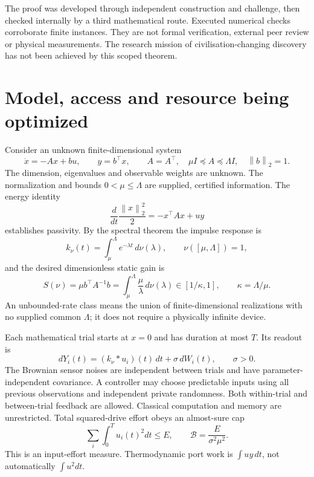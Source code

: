 \documentclass[11pt,a4paper]{article}
\newcommand{\norm}[1]{\left\lVert#1\right\rVert}
\begin{document}
The proof was developed through independent construction and challenge, then checked internally by a third mathematical route. Executed numerical checks corroborate finite instances. They are not formal verification, external peer review or physical measurements. The research mission of civilisation-changing discovery has not been achieved by this scoped theorem.

\section{Model, access and resource being optimized}

Consider an unknown finite-dimensional system
\begin{equation}\label{eq:model}
\dot x=-Ax+bu,\qquad y=b^\top x,\qquad
A=A^\top,\quad \mu I\preceq A\preceq\Lambda I,\quad \norm{b}_2=1.
\end{equation}
The dimension, eigenvalues and observable weights are unknown. The normalization and bounds $0<\mu\leq\Lambda$ are supplied, certified information. The energy identity
\begin{equation}
\frac{d}{dt}\frac{\norm{x}_2^2}{2}=-x^\top Ax+uy
\end{equation}
establishes passivity. By the spectral theorem the impulse response is
\begin{equation}
k_\nu(t)=\int_\mu^\Lambda e^{-\lambda t}\,d\nu(\lambda),
\qquad \nu([\mu,\Lambda])=1,
\end{equation}
and the desired dimensionless static gain is
\begin{equation}\label{eq:target}
S(\nu)=\mu b^\top A^{-1}b
=\int_\mu^\Lambda\frac{\mu}{\lambda}\,d\nu(\lambda)\in[1/\kappa,1],
\qquad\kappa=\Lambda/\mu.
\end{equation}
An unbounded-rate class means the union of finite-dimensional realizations with no supplied common $\Lambda$; it does not require a physically infinite device.

Each mathematical trial starts at $x=0$ and has duration at most $T$. Its readout is
\begin{equation}\label{eq:noise}
dY_i(t)=(k_\nu*u_i)(t)\,dt+\sigma\,dW_i(t),\qquad \sigma>0.
\end{equation}
The Brownian sensor noises are independent between trials and have parameter-independent covariance. A controller may choose predictable inputs using all previous observations and independent private randomness. Both within-trial and between-trial feedback are allowed. Classical computation and memory are unrestricted. Total squared-drive effort obeys an almost-sure cap
\begin{equation}\label{eq:effort}
\sum_i\int_0^T u_i(t)^2dt\leq E,
\qquad \mathcal B=\frac{E}{\sigma^2\mu^2}.
\end{equation}
This is an input-effort measure. Thermodynamic port work is $\int uy\,dt$, not automatically $\int u^2dt$.
\end{document}

